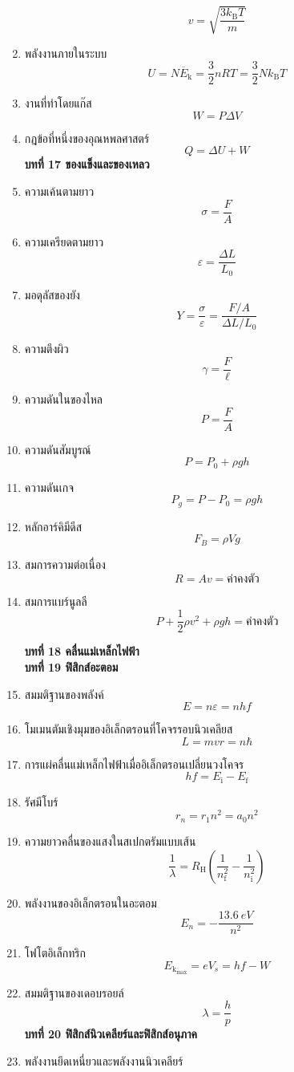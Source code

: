 \documentclass[12pt, a4paper]{article}
\begin{document}
\begin{enumerate}
		\[v=\sqrt{\frac{3k_\text{B}T}{m}}\]
	\item พลังงานภายในระบบ
		\[U=N\overbar{E}_\text{k}=\frac{3}{2}nRT=\frac{3}{2}Nk_\text{B}T\]
	\item งานที่ทำโดยแก๊ส
		\[W=P\Delta V\]
	\item กฎข้อที่หนึ่งของอุณหพลศาสตร์
		\[Q=\Delta U+W\]
	\textbf{บทที่ 17 ของแข็งและของเหลว}
	\item ความเค้นตามยาว
		\[\sigma=\frac{F}{A}\]
	\item ความเครียดตามยาว
		\[\varepsilon=\frac{\Delta L}{L_0}\]
	\item มอดุลัสของยัง
		\[Y=\frac{\sigma}{\varepsilon}=\frac{F/A}{\Delta L/L_0}\]
	\item ความตึงผิว
		\[\gamma=\frac{F}{\ell}\]
	\item ความดันในของไหล
		\[P=\frac{F}{A}\]
	\item ความดันสัมบูรณ์
		\[P=P_0+\rho g h\]
	\item ความดันเกจ
		\[P_g=P-P_0=\rho gh\]
	\item หลักอาร์คิมีดีส
		\[F_B=\rho Vg\]
	\item สมการความต่อเนื่อง
		\[R=Av=\text{ค่าคงตัว}\]
	\item สมการแบร์นูลลี
		\[P+\frac{1}{2}\rho v^2+\rho gh=\text{ค่าคงตัว}\]
	\begin{center}
	\end{center}
	\textbf{บทที่ 18 คลื่นแม่เหล็กไฟฟ้า}\\
	\textbf{บทที่ 19 ฟิสิกส์อะตอม}
	\item สมมติฐานของพลังค์
		\[E=n\varepsilon=nhf\]
	\item โมเมนตัมเชิงมุมของอิเล็กตรอนที่โคจรรอบนิวเคลียส
		\[L=mvr=n\hbar\]
	\item การแผ่คลื่นแม่เหล็กไฟฟ้าเมื่ออิเล็กตรอนเปลี่ยนวงโคจร
	 	\[hf=E_\text{i}-E_\text{f}\]
	\item รัศมีโบร์
	 	\[r_n=r_1n^2=a_0n^2\]
	\item ความยาวคลื่นของแสงในสเปกตรัมแบบเส้น
		\[\frac{1}{\lambda}=R_\text{H}\left(\frac{1}{n^2_\text{f}}-\frac{1}{n^2_{\text{i}}}\right)\]
	\item พลังงานของอิเล็กตรอนในอะตอม
		\[E_n=-\frac{\SI{13.6}{eV}}{n^2}\] 
	\item โฟโตอิเล็กทริก
		\[E_\mathrm{k_\text{max}}=eV_s=hf-W\]
	\item สมมติฐานของเดอบรอยล์
		\[\lambda=\frac{h}{p}\]
	\textbf{บทที่ 20 ฟิสิกส์นิวเคลียร์และฟิสิกส์อนุภาค}
	\item พลังงานยึดเหนี่ยวและพลังงานนิวเคลียร์

\end{enumerate}
\end{document}
